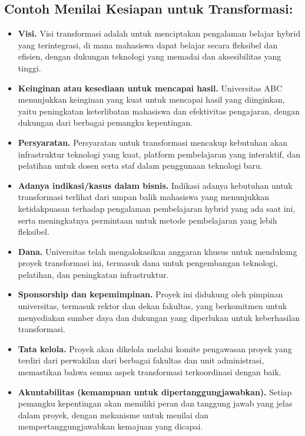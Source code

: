 \subsection*{Contoh Menilai Kesiapan untuk Transformasi:}
\begin{itemize}
	\item \textbf{Visi.} Visi transformasi adalah untuk menciptakan pengalaman belajar hybrid yang terintegrasi, di mana mahasiswa dapat belajar secara fleksibel dan efisien, dengan dukungan teknologi yang memadai dan aksesibilitas yang tinggi.
	
	\item \textbf{Keinginan atau kesediaan untuk mencapai hasil.} Universitas ABC menunjukkan keinginan yang kuat untuk mencapai hasil yang diinginkan, yaitu peningkatan keterlibatan mahasiswa dan efektivitas pengajaran, dengan dukungan dari berbagai pemangku kepentingan.
	
	\item \textbf{Persyaratan.} Persyaratan untuk transformasi mencakup kebutuhan akan infrastruktur teknologi yang kuat, platform pembelajaran yang interaktif, dan pelatihan untuk dosen serta staf dalam penggunaan teknologi baru.
	
	\item \textbf{Adanya indikasi/kasus dalam bisnis.} Indikasi adanya kebutuhan untuk transformasi terlihat dari umpan balik mahasiswa yang menunjukkan ketidakpuasan terhadap pengalaman pembelajaran hybrid yang ada saat ini, serta meningkatnya permintaan untuk metode pembelajaran yang lebih fleksibel.
	
	\item \textbf{Dana.} Universitas telah mengalokasikan anggaran khusus untuk mendukung proyek transformasi ini, termasuk dana untuk pengembangan teknologi, pelatihan, dan peningkatan infrastruktur.
	
	\item \textbf{Sponsorship dan kepemimpinan.} Proyek ini didukung oleh pimpinan universitas, termasuk rektor dan dekan fakultas, yang berkomitmen untuk menyediakan sumber daya dan dukungan yang diperlukan untuk keberhasilan transformasi.
	
	\item \textbf{Tata kelola.} Proyek akan dikelola melalui komite pengawasan proyek yang terdiri dari perwakilan dari berbagai fakultas dan unit administrasi, memastikan bahwa semua aspek transformasi terkoordinasi dengan baik.
	
	\item \textbf{Akuntabilitas (kemampuan untuk dipertanggungjawabkan).} Setiap pemangku kepentingan akan memiliki peran dan tanggung jawab yang jelas dalam proyek, dengan mekanisme untuk menilai dan mempertanggungjawabkan kemajuan yang dicapai.
	

\end{itemize}
